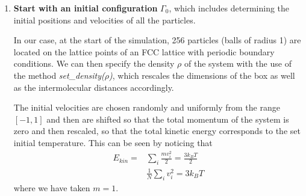 \documentclass[11pt]{article}
\begin{document}
\begin{enumerate}
	\item \textbf{Start with an initial configuration} $\Gamma_0$, which includes determining the initial positions and velocities of all the particles.

	 In our case, at the start of the simulation, 256 particles (balls of radius 1) are located on the lattice points of an FCC lattice with periodic boundary conditions. We can then specify the density $\rho$ of the system with the use of the method \textit{set\_density($\rho$)}, which rescales the dimensions of the box as well as the intermolecular distances accordingly. 
	 
	 The initial velocities are chosen randomly and uniformly from the range $[-1, 1]$ and then are shifted 
	 	so that the total momentum of the system is zero and then rescaled, so that the total kinetic energy corresponds to the set initial temperature. This can be seen by noticing that
	 	\begin{align}
	 		E_{kin}=&\sum_i\frac{m v_i^2}2=\frac{3k_BT}2\nonumber\\
	 		&\frac1N\sum_i v_i^2=3k_BT \label{kinetic_energy_temperature}
	 	\end{align}
	where we have taken $m=1$.
	

\end{enumerate}
\end{document}
